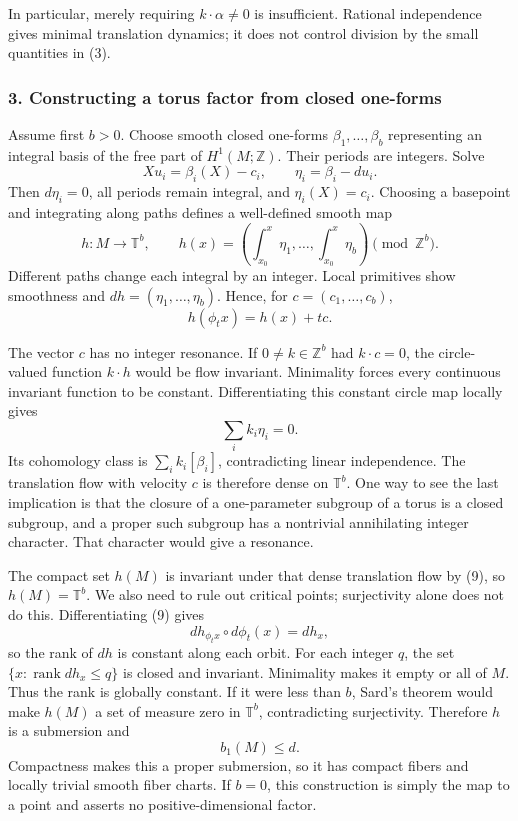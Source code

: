\documentclass[11pt]{article}
\begin{document}
In particular, merely requiring $k\cdot\alpha\ne0$ is insufficient. Rational independence gives minimal translation dynamics; it does not control division by the small quantities in (3).

\subsubsection{3. Constructing a torus factor from closed one-forms}
Assume first $b>0$. Choose smooth closed one-forms $\beta_1,\ldots,\beta_b$ representing an integral basis of the free part of $H^1(M;\mathbb Z)$. Their periods are integers. Solve
\[
 Xu_i=\beta_i(X)-c_i,\qquad
 \eta_i=\beta_i-du_i.
\]
Then $d\eta_i=0$, all periods remain integral, and $\eta_i(X)=c_i$. Choosing a basepoint and integrating along paths defines a well-defined smooth map
\[
 h:M\longrightarrow\mathbb T^b,\qquad
 h(x)=\left(\int_{x_0}^x\eta_1,\ldots,
                 \int_{x_0}^x\eta_b\right)\pmod{\mathbb Z^b}.
                                                               \tag{8}
\]
Different paths change each integral by an integer. Local primitives show smoothness and $dh=(\eta_1,\ldots,\eta_b)$. Hence, for $c=(c_1,\ldots,c_b)$,
\[
 h(\phi_t x)=h(x)+tc.                                   \tag{9}
\]

The vector $c$ has no integer resonance. If $0\ne k\in\mathbb Z^b$ had $k\cdot c=0$, the circle-valued function $k\cdot h$ would be flow invariant. Minimality forces every continuous invariant function to be constant. Differentiating this constant circle map locally gives
\[
 \sum_i k_i\eta_i=0.
\]
Its cohomology class is $\sum_i k_i[\beta_i]$, contradicting linear independence. The translation flow with velocity $c$ is therefore dense on $\mathbb T^b$. One way to see the last implication is that the closure of a one-parameter subgroup of a torus is a closed subgroup, and a proper such subgroup has a nontrivial annihilating integer character. That character would give a resonance.

The compact set $h(M)$ is invariant under that dense translation flow by (9), so $h(M)=\mathbb T^b$. We also need to rule out critical points; surjectivity alone does not do this. Differentiating (9) gives
\[
 dh_{\phi_t x}\circ d\phi_t(x)=dh_x,
\]
so the rank of $dh$ is constant along each orbit. For each integer $q$, the set $\{x:\operatorname{rank}dh_x\leq q\}$ is closed and invariant. Minimality makes it empty or all of $M$. Thus the rank is globally constant. If it were less than $b$, Sard's theorem would make $h(M)$ a set of measure zero in $\mathbb T^b$, contradicting surjectivity. Therefore $h$ is a submersion and
\[
 b_1(M)\leq d.                                         \tag{10}
\]
Compactness makes this a proper submersion, so it has compact fibers and locally trivial smooth fiber charts. If $b=0$, this construction is simply the map to a point and asserts no positive-dimensional factor.
\end{document}
